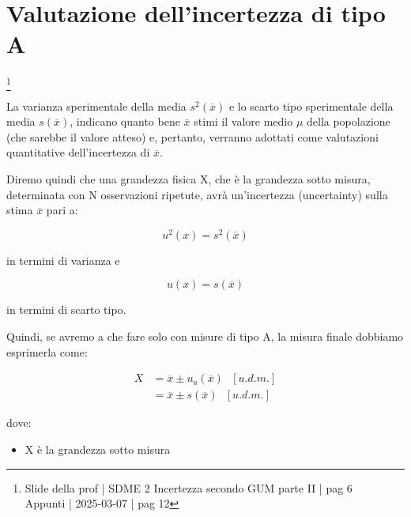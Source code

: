 \newpage 

\section{Valutazione dell'incertezza di tipo A}
\footnote{Slide della prof | SDME 2 Incertezza secondo GUM parte II | pag 6 \\  
Appunti | 2025-03-07 | pag 12}

La varianza sperimentale della media $s^{2}(\overline{x})$ e lo scarto tipo sperimentale della media $s (\overline{x})$, 
indicano quanto bene $\overline{x}$ stimi il valore medio $\mu$ della popolazione (che sarebbe il valore atteso) e, pertanto, verranno 
adottati come valutazioni quantitative dell'incertezza di $\overline{x}$. \newline 

Diremo quindi che una grandezza fisica X, che è la grandezza sotto misura, determinata con N osservazioni ripetute, 
avrà un'incertezza (uncertainty) sulla stima $\overline{x}$ pari a: 

{
    \Large 
    \begin{equation}
        u^{2} (x) = s^{2} (\overline{x})
    \end{equation}
}

in termini di varianza e 

{
    \Large 
    \begin{equation}
        u(x) = s(\overline{x})
    \end{equation}
}

in termini di scarto tipo. \newline 

Quindi, se avremo a che fare solo con misure di tipo A, 
la misura finale dobbiamo esprimerla come: 

{
    \Large 
    \begin{equation}
        \begin{split}
            X 
            &= 
            \overline{x} \pm u_a (\overline{x}) \text{ } [u.d.m.] 
            \\ 
            &= 
            \overline{x} \pm s (\overline{x}) \text{ } [u.d.m.]  
        \end{split}
    \end{equation}
}

dove: 
\begin{itemize}
    \item X è la grandezza sotto misura
\end{itemize}

